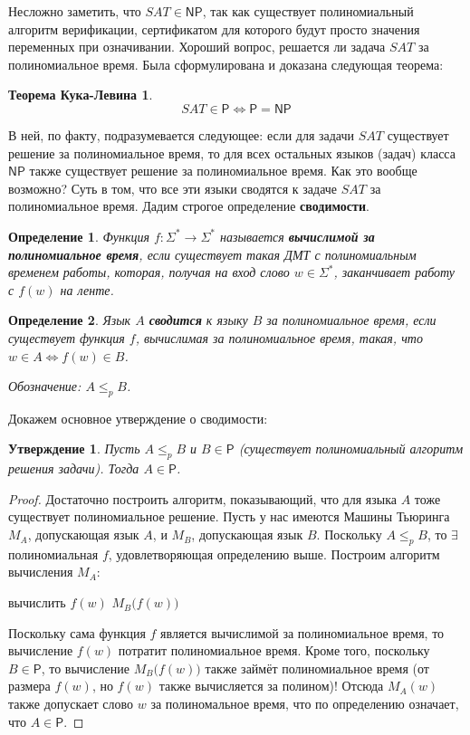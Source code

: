 \documentclass[a4paper,12pt]{article}
\newtheorem{definition}{Определение}
\newcommand{\Pclass}{\mathsf{P}}
\newcommand{\NPclass}{\mathsf{NP}}
\newtheorem{statement}{Утверждение}
\newtheorem*{kuk}{Теорема Кука-Левина}
\begin{document}
Несложно заметить, что $SAT \in \NPclass$, так как существует полиномиальный алгоритм верификации, сертификатом для которого будут просто значения переменных при означивании. Хороший вопрос, решается ли задача $SAT$ за полиномиальное время. Была сформулирована и доказана следующая теорема:
\begin{kuk}
\[SAT \in \Pclass \Longleftrightarrow \Pclass = \NPclass\]
\end{kuk}
В ней, по факту, подразумевается следующее: если для задачи $SAT$ существует решение за полиномиальное время, то для всех остальных языков (задач) класса $\NPclass$ также существует решение за полиномиальное время. Как это вообще возможно? Суть в том, что все эти языки $\textbf{сводятся}$ к задаче $SAT$ за полиномиальное время. Дадим строгое определение \textbf{сводимости}.
\begin{definition}
    Функция $f : \Sigma^* \to \Sigma^*$ называется \textbf{вычислимой за полиномиальное время}, если существует такая ДМТ с полиномиальным временем работы, которая, получая на вход слово $w \in \Sigma^*$, заканчивает работу с $f(w)$ на ленте.
\end{definition}
\begin{definition}
    Язык $A$ \textbf{сводится} к языку $B$ за полиномиальное время, если существует функция $f$, вычислимая за полиномиальное время, такая, что $w \in A \Longleftrightarrow f(w) \in B$.
    
    Обозначение: $A \leqslant_p B$.
\end{definition}
Докажем основное утверждение о сводимости:
\begin{statement}
    Пусть $A \leqslant_p B$ и $B \in \Pclass$ (существует полиномиальный алгоритм решения задачи). Тогда $A \in \Pclass$.
\end{statement}
\begin{proof}
 Достаточно построить алгоритм, показывающий, что для языка $A$ тоже существует полиномиальное решение. Пусть у нас имеются Машины Тьюринга $M_A$, допускающая язык $A$, и $M_B$, допускающая язык $B$. Поскольку $A \leqslant_p B$, то $\exists$ полиномиальная $f$, удовлетворяющая определению выше. Построим алгоритм вычисления $M_A$:
 \begin{algorithmic}
    \State вычислить $f(w)$
    \State \Return $M_B\big(f(w)\big)$
 \end{algorithmic}
 Поскольку сама функция $f$ является вычислимой за полиномиальное время, то вычисление $f(w)$ потратит полиномиальное время. Кроме того, поскольку $B \in \Pclass$, то вычисление $M_B\big(f(w)\big)$ также займёт полиномиальное время (от размера $f(w)$, но $f(w)$ также вычисляется за полином)! Отсюда $M_A(w)$ также допускает слово $w$ за полиномальное время, что по определению означает, что $A \in \Pclass$.
\end{proof}
\end{document}
